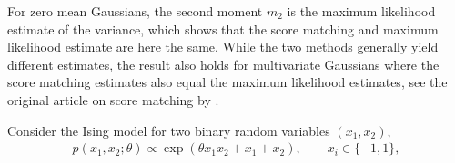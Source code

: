 \begin{exenumerate}
\begin{solution}
      For zero mean Gaussians, the second moment $m_2$ is the maximum likelihood
      estimate of the variance, which shows that the score matching and maximum
      likelihood estimate are here the same. While the two methods generally
      yield different estimates, the result also holds for multivariate
      Gaussians where the score matching estimates also equal the maximum
      likelihood estimates, see the original article on score matching by
      \citet{Hyvarinen2005c}.
      
  \end{solution}
  
\end{exenumerate}


Consider the Ising model for two binary random variables $(x_1,x_2)$,
\begin{align*}
  p(x_1,x_2;\theta) \propto \exp\left(\theta x_1 x_2+x_1+x_2\right), \quad \quad x_i \in \{-1,1\},
  \label{eq:Q1energy}
\end{align*}


